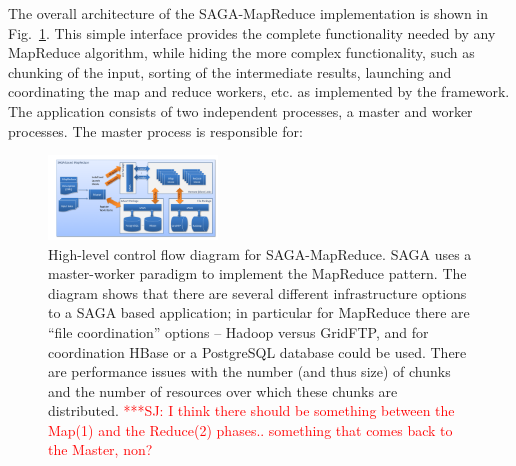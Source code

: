 \documentclass[conference,final]{IEEEtran}
\newcommand{\jhanote}[1]{ {\textcolor{red} { ***SJ: #1 }}}
\newcommand{\jhanote}[1]{}
\begin{document}


The overall architecture of the SAGA-MapReduce implementation is shown
in Fig.~\ref{saga-mapreduce_controlflow}. This simple interface
provides the complete functionality needed by any MapReduce algorithm,
while hiding the more complex functionality, such as chunking of the
input, sorting of the intermediate results, launching and coordinating
the map and reduce workers, etc. as implemented by the framework.  The
application consists of two independent processes, a master and worker
processes. The master process is responsible for:

\begin{figure}[t]
      \centering
          \includegraphics[width=0.4\textwidth]{saga-mapreduce_controlflow.png}
          \caption{High-level control flow diagram for
            SAGA-MapReduce. SAGA uses a master-worker paradigm to
            implement the MapReduce pattern. The diagram shows that
            there are several different infrastructure options to a
            SAGA based application; in particular for MapReduce there
            are ``file coordination'' options -- Hadoop versus
            GridFTP, and for coordination HBase or a PostgreSQL
            database could be used. There are performance issues with
            the number (and thus size) of chunks and the number of
            resources over which these chunks are distributed.
            \jhanote{I think there should be something between the
              Map(1) and the Reduce(2) phases.. something that comes
              back to the Master, non?}}
      \label{saga-mapreduce_controlflow}
\end{figure}
\end{document}
